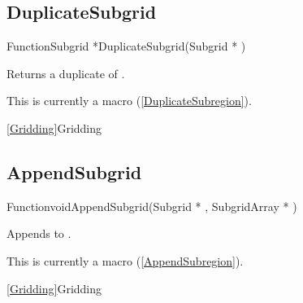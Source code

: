 
\newpage
\subsection{DuplicateSubgrid}
\label{DuplicateSubgrid}


\begin{deftypefn}{Function}{Subgrid *}{DuplicateSubgrid}({Subgrid *} )

\DESCRIPTION
Returns a duplicate of .

\NOTES
This is currently a macro (\ref{DuplicateSubregion}).

\SEEALSO
\vref{Gridding}{Gridding}

\end{deftypefn}


\newpage
\subsection{AppendSubgrid}
\label{AppendSubgrid}


\begin{deftypefn}{Function}{void}{AppendSubgrid}({Subgrid *} , {SubgridArray *} )

\DESCRIPTION
Appends  to .

\NOTES
This is currently a macro (\ref{AppendSubregion}).

\SEEALSO
\vref{Gridding}{Gridding}

\end{deftypefn}


